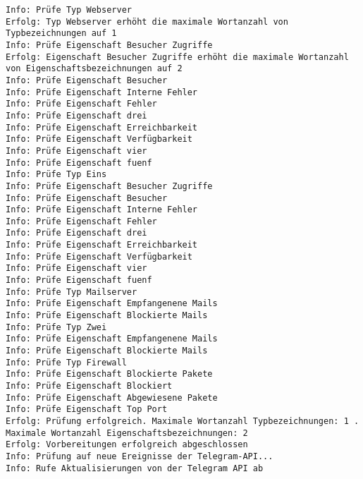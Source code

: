 \begin{lstlisting}[caption={Konsolenausgabe beim Start des Programms}, label=log-start, xleftmargin=6mm]
Info: Prüfe Typ Webserver 
Erfolg: Typ Webserver erhöht die maximale Wortanzahl von Typbezeichnungen auf 1 
Info: Prüfe Eigenschaft Besucher Zugriffe 
Erfolg: Eigenschaft Besucher Zugriffe erhöht die maximale Wortanzahl von Eigenschaftsbezeichnungen auf 2 
Info: Prüfe Eigenschaft Besucher 
Info: Prüfe Eigenschaft Interne Fehler 
Info: Prüfe Eigenschaft Fehler 
Info: Prüfe Eigenschaft drei 
Info: Prüfe Eigenschaft Erreichbarkeit 
Info: Prüfe Eigenschaft Verfügbarkeit 
Info: Prüfe Eigenschaft vier 
Info: Prüfe Eigenschaft fuenf 
Info: Prüfe Typ Eins 
Info: Prüfe Eigenschaft Besucher Zugriffe 
Info: Prüfe Eigenschaft Besucher 
Info: Prüfe Eigenschaft Interne Fehler 
Info: Prüfe Eigenschaft Fehler 
Info: Prüfe Eigenschaft drei 
Info: Prüfe Eigenschaft Erreichbarkeit 
Info: Prüfe Eigenschaft Verfügbarkeit 
Info: Prüfe Eigenschaft vier 
Info: Prüfe Eigenschaft fuenf 
Info: Prüfe Typ Mailserver 
Info: Prüfe Eigenschaft Empfangenene Mails 
Info: Prüfe Eigenschaft Blockierte Mails 
Info: Prüfe Typ Zwei 
Info: Prüfe Eigenschaft Empfangenene Mails 
Info: Prüfe Eigenschaft Blockierte Mails 
Info: Prüfe Typ Firewall 
Info: Prüfe Eigenschaft Blockierte Pakete 
Info: Prüfe Eigenschaft Blockiert 
Info: Prüfe Eigenschaft Abgewiesene Pakete 
Info: Prüfe Eigenschaft Top Port 
Erfolg: Prüfung erfolgreich. Maximale Wortanzahl Typbezeichnungen: 1 . Maximale Wortanzahl Eigenschaftsbezeichnungen: 2 
Erfolg: Vorbereitungen erfolgreich abgeschlossen 
Info: Prüfung auf neue Ereignisse der Telegram-API... 
Info: Rufe Aktualisierungen von der Telegram API ab 
\end{lstlisting}

